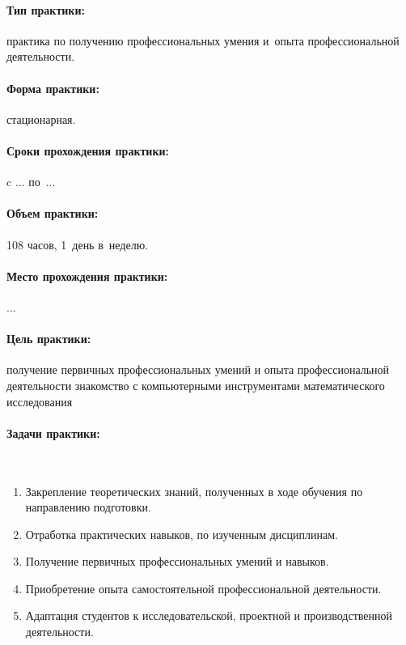 \documentclass[14pt,Otchet]{diplomwork}
\date{2020}
\author{студент МКб-4301-51-00}{Фамилых Имярек Батькович}
\institute{математики и информационных систем}
\begin{document}
\maketitle
\newpage

\tableofcontents

\paragraph{Тип практики:} практика по получению профессиональных умения и~опыта профессиональной деятельности.
		
\paragraph{Форма практики:}	стационарная.
\paragraph{Сроки прохождения практики:}
	c ... по~... 
\paragraph{Объем практики:} 108 часов, 1~день в~неделю.
\paragraph{Место прохождения практики:} ...

	
	
\paragraph{Цель практики:}
	получение первичных профессиональных умений и опыта профессиональной деятельности знакомство с компьютерными инструментами математического исследования

\paragraph{Задачи практики:}~\par
	\begin{enumerate}
	\item 
		Закрепление теоретических знаний, полученных в ходе обучения по направлению подготовки.
	\item 
		Отработка практических навыков, по изученным дисциплинам.
	\item 
		Получение первичных профессиональных умений и навыков.
	\item 
		Приобретение опыта самостоятельной профессиональной деятельности.
	\item 
		Адаптация студентов к исследовательской, проектной и производственной деятельности.

	\end{enumerate}
\end{document}
